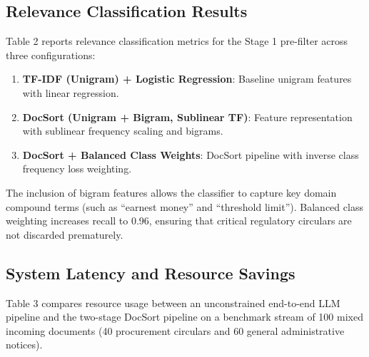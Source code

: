 \documentclass{article}
\begin{document}
\subsection{Relevance Classification Results}
Table 2 reports relevance classification metrics for the Stage 1 pre-filter across three configurations:
\begin{enumerate}
    \item \textbf{TF-IDF (Unigram) + Logistic Regression}: Baseline unigram features with linear regression.
    \item \textbf{DocSort (Unigram + Bigram, Sublinear TF)}: Feature representation with sublinear frequency scaling and bigrams.
    \item \textbf{DocSort + Balanced Class Weights}: DocSort pipeline with inverse class frequency loss weighting.
\end{enumerate}

\begin{table}[t]
\centering
{}
\caption{Relevance classification performance on the test split.}
\label{tab:relevance}
\end{table}

The inclusion of bigram features allows the classifier to capture key domain compound terms (such as ``earnest money'' and ``threshold limit''). Balanced class weighting increases recall to 0.96, ensuring that critical regulatory circulars are not discarded prematurely.

\subsection{System Latency and Resource Savings}
Table 3 compares resource usage between an unconstrained end-to-end LLM pipeline and the two-stage DocSort pipeline on a benchmark stream of 100 mixed incoming documents (40 procurement circulars and 60 general administrative notices).
\end{document}
